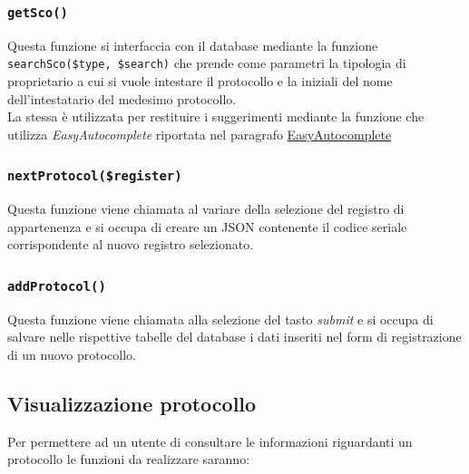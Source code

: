     \subsubsection{\texttt{getSco()}}
    Questa funzione si interfaccia con il database mediante la funzione \texttt{searchSco(\$type, \$search)} che prende come parametri la tipologia di proprietario a cui si vuole intestare il protocollo e la iniziali del nome dell'intestatario del medesimo protocollo. 
    \\
    La stessa è utilizzata per restituire i suggerimenti mediante la funzione che utilizza \textit{EasyAutocomplete} riportata nel paragrafo \hyperref[EasyAutocomplete]{EasyAutocomplete}
    
    \subsubsection{\texttt{nextProtocol(\$register)}}
    Questa funzione viene chiamata al variare della selezione del registro di appartenenza e si occupa di creare un JSON contenente il codice seriale corrispondente al nuovo registro selezionato.
    
    \subsubsection{\texttt{addProtocol()}}
    Questa funzione viene chiamata alla selezione del tasto \textit{submit} e si occupa di salvare nelle rispettive tabelle del database i dati inseriti nel form di registrazione di un nuovo protocollo.
    
    \subsection{Visualizzazione protocollo}
    Per permettere ad un utente di consultare le informazioni riguardanti un protocollo le funzioni da realizzare saranno:
    

